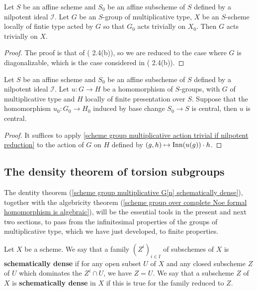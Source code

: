 \begin{proposition}\label{scheme group multiplicative action trivial if nilpotent reduction}
Let $S$ be an affine scheme and $S_0$ be an affine subscheme of $S$ defined by a nilpotent ideal $\mathscr{I}$. Let $G$ be an $S$-group of multiplicative type, $X$ be an $S$-scheme locally of fintie type acted by $G$ so that $G_0$ acts trivially on $X_0$. Then $G$ acts trivially on $X$.
\end{proposition}
\begin{proof}
The proof is that of (\cite{SGA3-1}  2.4(b)), so we are reduced to the case where $G$ is diagonalizable, which is the case considered in (\cite{SGA3-1}  2.4(b)).
\end{proof}

\begin{corollary}\label{scheme group multiplicative morphism central if nilpotent reduction}
Let $S$ be an affine scheme and $S_0$ be an affine subscheme of $S$ defined by a nilpotent ideal $\mathscr{I}$. Let $u:G\to H$ be a homomorphism of $S$-groups, with $G$ of multiplicative type and $H$ locally of finite presentation over $S$. Suppose that the homomorphism $u_0:G_0\to H_0$ induced by base change $S_0\to S$ is central, then $u$ is central.
\end{corollary}
\begin{proof}
It suffices to apply \cref{scheme group multiplicative action trivial if nilpotent reduction} to the action of $G$ on $H$ defined by $(g,h)\mapsto\mathrm{Inn}(u(g))\cdot h$.
\end{proof}

\subsection{The density theorem of torsion subgroups}
The dentity theorem (\cref{scheme group multiplicative G[n] schematically dense}), together with the algebricity theorem (\cref{scheme group over complete Noe formal homomorphism is algebraic}), will be the essential tools in the present and next two sections, to pass from the infinitesimal properties of the groups of multiplicative type, which we have just developed, to finite properties.

\begin{definition}
Let $X$ be a scheme. We say that a family $(Z^i)_{i\in I}$ of subschemes of $X$ is \textbf{schematically dense} if for any open subset $U$ of $X$ and any closed subscheme $Z$ of $U$ which dominates the $Z^i\cap U$, we have $Z=U$. We say that a subscheme $Z$ of $X$ is \textbf{schematically dense} in $X$ if this is true for the family reduced to $Z$.
\end{definition}

